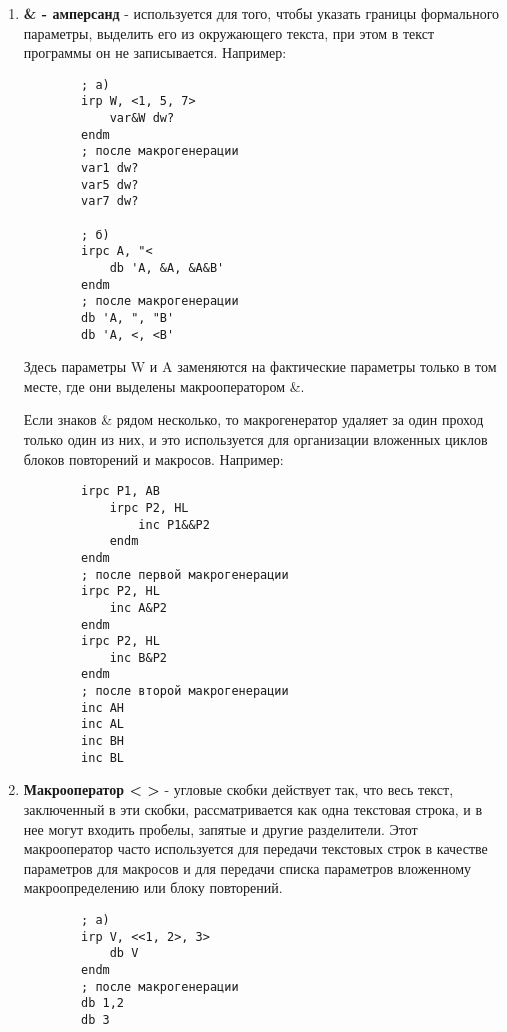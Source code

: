 \begin{enumerate}
    \item \textbf{& - амперсанд} - используется для того, чтобы указать границы формального параметры, выделить его из окружающего текста, при этом в текст программы он не записывается. Например:
    \begin{verbatim}
        ; a)
        irp W, <1, 5, 7>
            var&W dw?
        endm
        ; после макрогенерации
        var1 dw?
        var5 dw?
        var7 dw?

        ; б)
        irpc A, "<
            db 'A, &A, &A&B'
        endm
        ; после макрогенерации
        db 'A, ", "B'
        db 'A, <, <B'
    \end{verbatim}
    Здесь параметры W и A заменяются на фактические параметры только в том месте, где они выделены макрооператором &.

    Если знаков & рядом несколько, то макрогенератор удаляет за один проход только один из них, и это используется для организации вложенных циклов блоков повторений и макросов. Например:
    \begin{verbatim}
        irpc P1, AB
            irpc P2, HL
                inc P1&&P2
            endm
        endm
        ; после первой макрогенерации
        irpc P2, HL
            inc A&P2
        endm
        irpc P2, HL
            inc B&P2
        endm
        ; после второй макрогенерации
        inc AH
        inc AL
        inc BH
        inc BL
    \end{verbatim}
    \item \textbf{Макрооператор < >} - угловые скобки действует так, что весь текст, заключенный в эти скобки, рассматривается как одна текстовая строка, и в нее могут входить пробелы, запятые и другие разделители.
    Этот макрооператор часто используется для передачи текстовых строк в качестве параметров для макросов и для передачи списка параметров вложенному макроопределению или блоку повторений.
    \begin{verbatim}
        ; a)
        irp V, <<1, 2>, 3>
            db V
        endm
        ; после макрогенерации 
        db 1,2
        db 3


\end{verbatim}
\end{enumerate}
